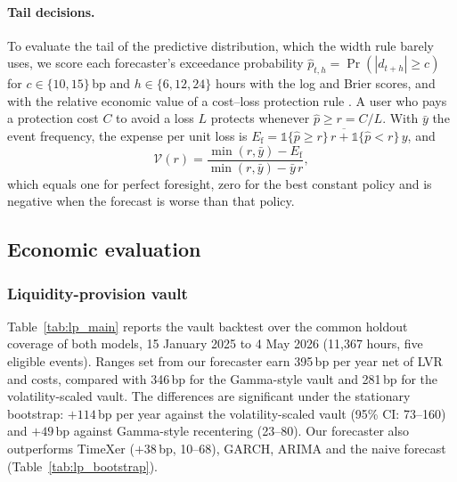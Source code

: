 \paragraph{Tail decisions.} To evaluate the tail of the predictive distribution, which the
width rule barely uses, we score each forecaster's exceedance probability
$\hat p_{t,h}=\Pr(|d_{t+h}|\ge c)$ for $c\in\{10,15\}$\,bp and $h\in\{6,12,24\}$ hours with
the log and Brier scores, and with the relative economic value of a cost--loss protection
rule \citep{Richardson2000}. A user who pays a protection cost $C$ to avoid a loss $L$ protects
whenever $\hat p\ge r=C/L$. With $\bar y$ the event frequency, the expense per unit loss is
$E_{\mathrm{f}}=\overline{\mathbb 1\{\hat p\ge r\}\,r+\mathbb 1\{\hat p<r\}\,y}$, and
\begin{equation}
\mathcal V(r)=\frac{\min(r,\bar y)-E_{\mathrm f}}{\min(r,\bar y)-\bar y\,r},
\end{equation}
which equals one for perfect foresight, zero for the best constant policy and is negative
when the forecast is worse than that policy.


\subsection{Economic evaluation}\label{sec:econ_results}

\subsubsection{Liquidity-provision vault}

Table~\ref{tab:lp_main} reports the vault backtest over the common holdout coverage of both
models, 15 January 2025 to 4 May 2026 (11,367 hours, five eligible events). Ranges set from
our forecaster earn 395\,bp per year net of LVR and costs, compared with 346\,bp for the
Gamma-style vault and 281\,bp for the volatility-scaled vault. The differences are significant
under the stationary bootstrap: $+114$\,bp per year against the volatility-scaled vault (95\%
CI: 73--160) and $+49$\,bp against Gamma-style recentering (23--80). Our forecaster also
outperforms TimeXer ($+38$\,bp, 10--68), GARCH, ARIMA and the naive forecast
(Table~\ref{tab:lp_bootstrap}).

